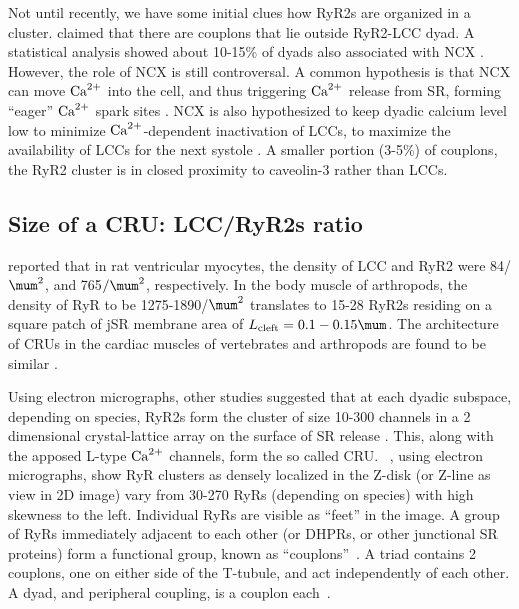 Not until recently, we have some initial clues how RyR2s are organized in a
cluster. \citep{asghari2012} claimed that there are couplons that lie outside
RyR2-LCC dyad. A statistical analysis showed about 10-15\% of dyads also
associated with NCX \citep{scriven2000}. However, the role of NCX is still
controversal. A common hypothesis is that NCX can move ${\text{Ca}^{2+}}$ into the cell, and
thus triggering ${\text{Ca}^{2+}}$ release from  SR, forming ``eager'' ${\text{Ca}^{2+}}$ spark sites
\citep{Larbig2010}. NCX is also hypothesized to keep dyadic calcium level low to
minimize ${\text{Ca}^{2+}}$-dependent inactivation of LCCs, to maximize the availability of
LCCs for the next systole \citep{sher2008}. A smaller portion (3-5\%) of
couplons, the RyR2 cluster is in closed proximity to caveolin-3 rather than
LCCs.


\subsection{Size of a CRU: LCC/RyR2s ratio}
\label{sec:CRU_size}


\citep{wibo1991} reported that in rat ventricular myocytes, the density of LCC
and RyR2 were 84/$\mum^2$, and 765$/\mum^2$, respectively. In the body muscle of
arthropods, the density of RyR to be 1275-1890/$\mum^2$ translates to 15-28
RyR2s residing on a square patch of jSR membrane area of
$L_\text{cleft}=0.1-0.15 \mum$. The architecture of CRUs in the cardiac muscles
of vertebrates and arthropods are found to be similar \citep{takekura2002}.

Using electron micrographs, other studies suggested that at each dyadic
subspace, depending on species, RyR2s form the cluster of size 10-300 channels
in a 2 dimensional crystal-lattice array on the surface of SR release
\citep{franzini_armstrong1997,franzini_armstrong1998,franzini_armstrong1999ssd}.
This, along with the apposed L-type ${\text{Ca}^{2+}}$ channels, form the so called CRU.
~\citep{franzini_armstrong1999ssd}, using electron micrographs,
  show RyR clusters as densely localized in the Z-disk (or Z-line as
  view in 2D image) vary from 30-270 RyRs (depending on species) with
  high skewness to the left. Individual RyRs are visible as ``feet''
  in the image. A group of RyRs immediately adjacent to each other (or
  DHPRs, or other junctional SR proteins) form a functional group,
  known as ``couplons''~\citep{stern1997,rios1997}. A triad contains 2
  couplons, one on either side of the T-tubule, and act independently
  of each other. A dyad, and peripheral coupling, is a couplon
  each~\citep{sommer1998}.
 
